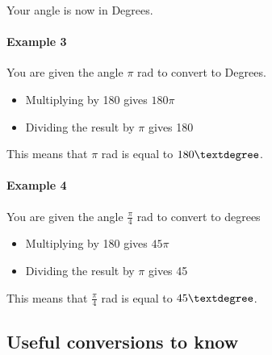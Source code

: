 \documentclass[
  12pt,
  a4paper, oneside]{starmastarticle}
\let\oldparagraph\paragraph
\renewcommand{\paragraph}[1]{\oldparagraph{#1}\mbox{}}
\providecommand{\tightlist}{%
  \setlength{\itemsep}{0pt}\setlength{\parskip}{0pt}}\usepackage{longtable,booktabs,array}
\begin{document}
Your angle is now in Degrees.

\hypertarget{example-3}{%
\paragraph{Example 3}\label{example-3}}

You are given the angle \(\pi\) rad to convert to Degrees.

\begin{itemize}
\tightlist
\item
  Multiplying by 180 gives \(180\pi\)
\item
  Dividing the result by \(\pi\) gives 180
\end{itemize}

This means that \(\pi\) rad is equal to \(180\textdegree\).

\hypertarget{example-4}{%
\paragraph{Example 4}\label{example-4}}

You are given the angle \(\frac{\pi}{4}\) rad to convert to degrees

\begin{itemize}
\tightlist
\item
  Multiplying by 180 gives \(45\pi\)
\item
  Dividing the result by \(\pi\) gives 45
\end{itemize}

This means that \(\frac{\pi}{4}\) rad is equal to \(45\textdegree\).

\hypertarget{useful-conversions-to-know}{%
\subsection{Useful conversions to
know}\label{useful-conversions-to-know}}
\end{document}
